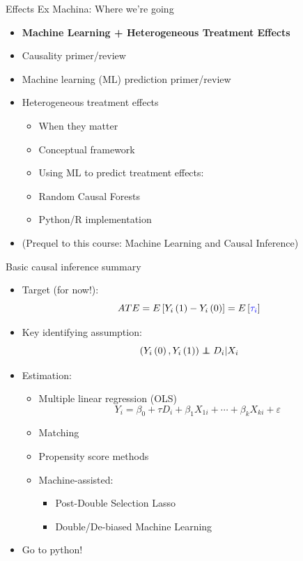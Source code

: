 \documentclass{beamer}
\newcommand\independent{\protect\mathpalette{\protect\independenT}{\perp}}
\def\independenT#1#2{\mathrel{\rlap{$#1#2$}\mkern2mu{#1#2}}}
\begin{document}
\begin{frame}{Effects Ex Machina: Where we're going}
\begin{itemize}
\item[] \textbf{Machine Learning + Heterogeneous Treatment Effects}
\item Causality primer/review
\item Machine learning (ML) prediction primer/review
\item Heterogeneous treatment effects
	\begin{itemize}
		\item When they matter
		\item Conceptual framework
		\item Using ML to predict treatment effects:
		\item[] Random Causal Forests
		\item Python/R implementation
	\end{itemize}
\item[] (Prequel to this course: Machine Learning and Causal Inference)
\end{itemize}
\end{frame}


\begin{frame}{Basic causal inference summary}
\begin{itemize}
\item Target (for now!):
\[
ATE = E\left[Y_i\left(1\right)-Y_i\left(0\right)\right]=E\left[{\color{blue}\tau_i}\right]
\]
\item Key identifying assumption:
\[
\left(Y_i\left(0\right),Y_i\left(1\right)\right) \independent D_i | X_i
\]
\item Estimation:
	\begin{itemize}
		\item Multiple linear regression (OLS)
		\[
			Y_i = \beta_0 + \tau D_i +\beta_1 X_{1i} + \cdots + \beta_k X_{ki} +\varepsilon
		\]
		\item Matching
		\item Propensity score methods
		\item Machine-assisted:
		\begin{itemize}
			\item Post-Double Selection Lasso
			\item Double/De-biased Machine Learning
		\end{itemize}
	\end{itemize}
	\item Go to python!
\end{itemize}
\end{frame}
\end{document}
